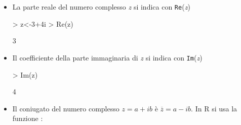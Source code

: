 \documentclass[onecolumn,11pt]{book}
\newcommand{\varia}[1]{\textsl{\textsf{#1}}}
\begin{document}
\begin{itemize}
\item{} La parte reale del numero complesso \varia{z} si indica con \texttt{Re}(\varia{z})
\begin{Schunk}
\begin{Sinput}
> z<-3+4i
> Re(z)
\end{Sinput}
\begin{Soutput}
[1] 3
\end{Soutput}
\end{Schunk}

\item{} Il coefficiente della parte immaginaria di \varia{z} si indica con
 \texttt{Im}(\varia{z})
\begin{Schunk}
\begin{Sinput}
>  Im(z)
\end{Sinput}
\begin{Soutput}
[1] 4
\end{Soutput}
\end{Schunk}
\item{}Il coniugato del numero complesso $z=a +ib$ \`e $\overline{z}=a-ib$. In \textsf{R} si usa la funzione :


\end{itemize}
\end{document}

